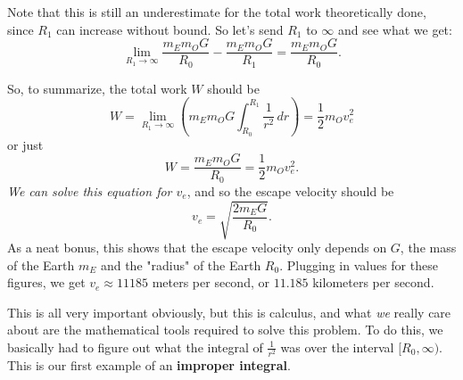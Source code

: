 \documentclass[10pt,]{book}
\newcommand{\terminology}[1]{\textbf{#1}}
\theoremstyle{ptxplainnotitle}
\theoremstyle{ptxplaintitle}
\theoremstyle{ptxplainnotitle}
\theoremstyle{ptxplaintitle}
\theoremstyle{ptxplainnotitle}
\theoremstyle{ptxplaintitle}
\theoremstyle{ptxdefinitionnotitle}
\theoremstyle{ptxdefinitiontitle}
\theoremstyle{ptxdefinitionnotitle}
\theoremstyle{ptxdefinitiontitle}
\theoremstyle{ptxdefinitionnotitle}
\theoremstyle{ptxdefinitiontitle}
\theoremstyle{ptxdefinitionnotitle}
\theoremstyle{ptxdefinitiontitle}
\theoremstyle{ptxdefinitionnotitle}
\theoremstyle{ptxdefinitiontitle}
\numberwithin{equation}{section}
\begin{document}
Note that this is still an underestimate for the total work theoretically done, since \(R_{1}\) can increase without bound. So let's send \(R_{1}\) to \(\infty\) and see what we get:%
\begin{equation*}
\lim_{R_{1}\to\infty}\frac{m_{E}m_{O}G}{R_{0}} - \frac{m_{E}m_{O}G}{R_{1}} = \frac{m_{E}m_{O}G}{R_{0}}.
\end{equation*}
%
\par
\hypertarget{p-577}{}%
So, to summarize, the total work \(W\) should be%
\begin{equation*}
W = \lim_{R_{1}\to\infty}\left(m_{E}m_{O}G\int_{R_{0}}^{R_{1}}\frac{1}{r^{2}}\,dr\right) = \frac{1}{2}m_{O}v_{e}^{2}
\end{equation*}
or just%
\begin{equation*}
W = \frac{m_{E}m_{O}G}{R_{0}} = \frac{1}{2}m_{O}v_{e}^{2}.
\end{equation*}
\emph{We can solve this equation for \(v_{e}\)}, and so the escape velocity should be%
\begin{equation*}
v_{e} = \sqrt{\frac{2 m_{E}G}{R_{0}}}.
\end{equation*}
As a neat bonus, this shows that the escape velocity only depends on \(G\), the mass of the Earth \(m_{E}\) and the "radius" of the Earth \(R_{0}\). Plugging in values for these figures, we get \(v_{e} \approx 11185\) meters per second, or \(11.185\) kilometers per second.%
\par
\hypertarget{p-578}{}%
This is all very important obviously, but this is calculus, and what \emph{we} really care about are the mathematical tools required to solve this problem. To do this, we basically had to figure out what the integral of \(\frac{1}{r^{2}}\) was over the interval \([R_{0},\infty)\). This is our first example of an \terminology{improper integral}.%
\typeout{************************************************}
\typeout{************************************************}
\end{document}
